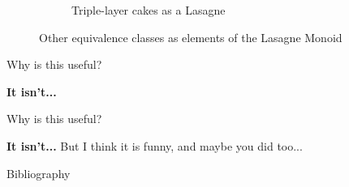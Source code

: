 \documentclass{beamer}
\begin{document}
\begin{frame}
\begin{figure}
\begin{subfigure}{.24\textwidth}
          \caption{\label{fig:cake-lasagne}Triple-layer cakes as a Lasagne}
        \end{subfigure}
        \caption{\label{fig:lasagne-subclasses}Other equivalence classes as elements of the Lasagne Monoid}
    \end{figure}
\end{frame}

\begin{frame}{Why is this useful?}
    \begin{center}
        \Huge\textbf{It isn't...}
    \end{center}
\end{frame}

\begin{frame}{Why is this useful?}
    \begin{center}
        \Huge\textbf{It isn't...}
        \vskip 2cm
        \small{But I think it is funny, and maybe you did too...}
    \end{center}
\end{frame}

\begin{frame}{Bibliography}
        \nocite{*}
        
        
\end{frame}
\end{document}
